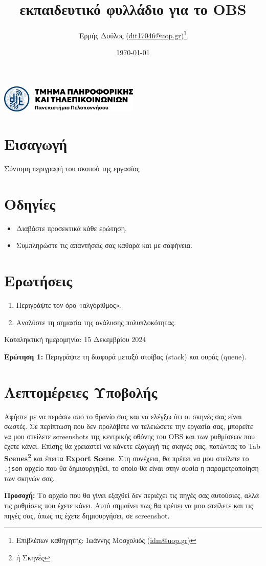 \documentclass[12pt,a4paper]{article}
\title{\textbf{εκπαιδευτικό φυλλάδιο για το OBS}}
\author{Ερμής Δούλος (\href{mailto:dit17046@uop.gr}{dit17046@uop.gr})\thanks{Επιβλέπων καθηγητής: Ιωάννης Μοσχολιός (\href{mailto:idm@uop.gr}{idm@uop.gr})}}
\date{\today}
\begin{document}
\maketitle
\begin{center}
\includegraphics[width=0.5\textwidth]{Figures/uop.png} 
\end{center}
\noindent\makebox[\linewidth]{\rule{\textwidth}{1.5pt}}

\section*{Εισαγωγή}
Σύντομη περιγραφή του σκοπού της εργασίας

\section{Οδηγίες}
\begin{itemize}
    \item Διαβάστε προσεκτικά κάθε ερώτηση.
    \item Συμπληρώστε τις απαντήσεις σας καθαρά και με σαφήνεια.
\end{itemize}

\section{Ερωτήσεις}
\begin{enumerate}[label=\textbf{Ερώτηση \arabic*.}]
    \item Περιγράψτε τον όρο «αλγόριθμος».
    \item Αναλύστε τη σημασία της ανάλυσης πολυπλοκότητας.
\end{enumerate}
\begin{info}
  Καταληκτική ημερομηνία: 15 Δεκεμβρίου 2024
\end{info}
\begin{questionbox}
\textbf{Ερώτηση 1:} Περιγράψτε τη διαφορά μεταξύ στοίβας (stack) και ουράς (queue).
\end{questionbox}
\section*{Λεπτομέρειες Υποβολής}
Αφήστε με να περάσω απο το θρανίο σας και να ελέγξω ότι οι σκηνές σας είναι σωστές.
Σε περίπτωση που δεν προλάβετε να τελειώσετε την εργασία σας, μπορείτε να μου στείλετε
screenshots της κεντρικής οθόνης του OBS και των ρυθμίσεων που έχετε κάνει. Επίσης θα χρειαστεί να 
κάνετε εξαγωγή τις σκηνές σας, πατώντας το Tab \textbf{Scenes\footnote{ή Σκηνές}} και έπειτα
\textbf{Export Scene}. Στη συνέχεια, θα πρέπει να μου στείλετε το \texttt{.json} αρχείο που θα δημιουργηθεί,
το οποίο θα είναι στην ουσία η παραμετροποίηση των σκηνών σας.
\begin{info}
\textbf{Προσοχή:} Το αρχείο που θα γίνει εξαχθεί δεν περιέχει τις πηγές σας αυτούσιες, αλλά τις ρυθμίσεις που έχετε κάνει.
Αυτό σημαίνει πως θα πρέπει να μου στείλετε και τις πηγές σας, όπως τις έχετε δημιουργήσει, σε screenshot.
\end{info}
\end{document}
